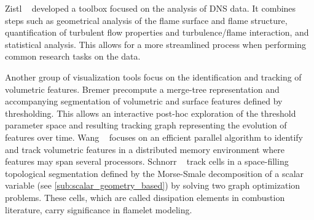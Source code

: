 %
Zistl \etal{}~\cite{Zistl2009} developed a toolbox focused on the analysis of
\ac{DNS} data.
%
It combines steps such as geometrical analysis of the flame surface and flame
structure, quantification of turbulent flow properties and turbulence/flame
interaction, and statistical analysis.
%
This allows for a more streamlined process when performing common research
tasks on the data.
%

%
Another group of visualization tools focus on the identification and tracking of
volumetric features.
%
Bremer \etal{} precompute a merge-tree representation and accompanying
segmentation of volumetric \cite{Bremer2009,Bremer2011} and surface features
\cite{Bremer2010} defined by thresholding.
%
This allows an interactive post-hoc exploration of the threshold parameter
space and resulting tracking graph representing the evolution of features over
time.
%
Wang \etal{}~\cite{Wang2013} focuses on an efficient parallel algorithm to
identify and track volumetric features in a distributed memory environment
where features may span several processors.
%
Schnorr \etal{}~\cite{Schnorr2018} track cells in a space-filling topological
segmentation defined by the Morse-Smale decomposition of a scalar variable (see
\cref{sub:scalar_geometry_based}) by solving two graph optimization problems.
%
These cells, which are called dissipation elements in combustion literature,
carry significance in flamelet modeling.
%

